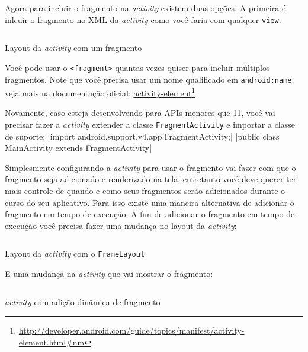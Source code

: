 \documentclass[a4paper,12pt,brazil]{book}
\begin{document}
\begin{singlespace}
Agora para incluir o fragmento na \emph{activity} existem duas opções. A primeira é inlcuir o fragmento no XML da \emph{activity} como você faria com qualquer \texttt{view}.

\begin{listing}[H]
\inputminted[linenos=true,fontsize=\small,frame=lines, framesep=2mm, tabsize=2,numbersep=5pt]{xml}{src/design/fragment-activity.xml}
\caption{Layout da \emph{activity} com um fragmento}
\end{listing}	

Você pode usar o \texttt{<fragment>} quantas vezes quiser para incluir múltiplos fragmentos.
Note que você precisa usar um nome qualificado em \texttt{android:name}, veja mais na documentação oficial: \href{http://developer.android.com/guide/topics/manifest/activity-element.html\#nm}{activity-element}\footnote{\href{http://developer.android.com/guide/topics/manifest/activity-element.html\#nm}{http://developer.android.com/guide/topics/manifest/activity-element.html\#nm}}

Novamente, caso esteja desenvolvendo para APIs menores que 11, você vai precisar fazer a \emph{activity} extender a classe \texttt{FragmentActivity} e importar a classe de suporte: |import android.support.v4.app.FragmentActivity;|
|public class MainActivity extends FragmentActivity|


Simplesmente configurando a \emph{activity} para usar o fragmento vai fazer com que o fragmento seja adicionado e renderizado na tela, entretanto você deve querer ter mais controle de quando e como seus fragmentos serão adicionados durante o curso do seu aplicativo. Para isso existe uma maneira alternativa de adicionar o fragmento em tempo de execução. A fim de adicionar o fragmento em tempo de execução você precisa fazer uma mudança no layout da \emph{activity}:

\begin{listing}[H]
\inputminted[linenos=true,fontsize=\small,frame=lines, framesep=2mm, tabsize=2,numbersep=5pt]{xml}{src/design/framelayout.xml}
\caption{Layout da \emph{activity} com o \texttt{FrameLayout}}
\end{listing}	

E uma mudança na \emph{activity} que vai mostrar o fragmento:

\begin{listing}[H]
\inputminted[linenos=true,fontsize=\small,frame=lines, framesep=2mm, tabsize=2,numbersep=5pt]{java}{src/design/activity-frag-dyn.java}
\caption{\emph{activity} com adição dinâmica de fragmento}
\end{listing}	


\end{singlespace}
\end{document}
